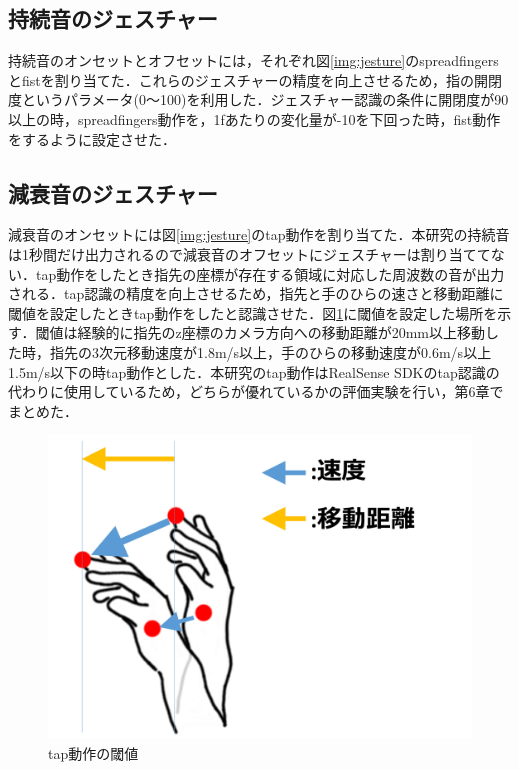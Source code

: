 \subsection{持続音のジェスチャー}
持続音のオンセットとオフセットには，それぞれ図\ref{img:jesture}のspreadfingersとfistを割り当てた．これらのジェスチャーの精度を向上させるため，指の開閉度というパラメータ(0〜100)を利用した．ジェスチャー認識の条件に開閉度が90以上の時，spreadfingers動作を，1fあたりの変化量が-10を下回った時，fist動作をするように設定させた．
\subsection{減衰音のジェスチャー}
減衰音のオンセットには図\ref{img:jesture}のtap動作を割り当てた．本研究の持続音は1秒間だけ出力されるので減衰音のオフセットにジェスチャーは割り当ててない．tap動作をしたとき指先の座標が存在する領域に対応した周波数の音が出力される．tap認識の精度を向上させるため，指先と手のひらの速さと移動距離に閾値を設定したときtap動作をしたと認識させた．図\ref{img:tap}に閾値を設定した場所を示す．閾値は経験的に指先のz座標のカメラ方向への移動距離が20mm以上移動した時，指先の3次元移動速度が1.8m/s以上，手のひらの移動速度が0.6m/s以上1.5m/s以下の時tap動作とした．本研究のtap動作はRealSense SDKのtap認識の代わりに使用しているため，どちらが優れているかの評価実験を行い，第6章でまとめた．
\begin{figure}[t]
	\begin{center}
		\includegraphics[width=1\linewidth]{./pics/03/tap.png}
		\caption{tap動作の閾値}
		\label{img:tap} 
	\end{center}
\end{figure}
